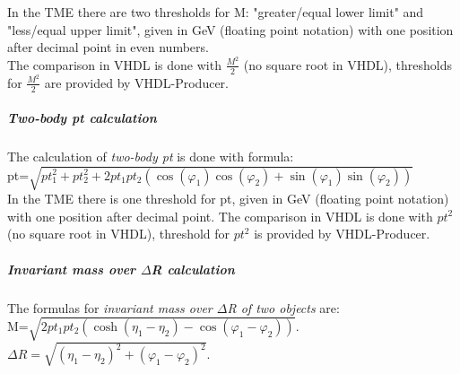 In the TME there are two thresholds for M: "greater/equal lower limit" and "less/equal upper limit", given in GeV (floating point notation) with one position after decimal point in even numbers.\\
The comparison in VHDL is done with $\frac{M^2}{2}$ (no square root in VHDL), thresholds for $\frac{M^2}{2}$ are provided by VHDL-Producer.

\subparagraph{Two-body pt calculation}
\label{sec:gtl:twobody_pt_calculation}

The calculation of \textit{two-body pt} is done with formula:\\

pt=$\sqrt{pt^2_1 + pt^2_2 + 2  pt_1 pt_2 (\cos(\varphi_1) \cos(\varphi_2) + \sin(\varphi_1) \sin(\varphi_2))}$\\

In the TME there is one threshold for pt, given in GeV (floating point notation) with one position after decimal point.
The comparison in VHDL is done with ${pt^2}$ (no square root in VHDL), threshold for ${pt^2}$ is provided by VHDL-Producer.

\subparagraph{Invariant mass over $\Delta$R calculation}
\label{sec:gtl:inv_mass_div_dr_calculation}

The formulas for \textit{invariant mass over $\Delta$R of two objects} are:\\

M=$\sqrt{2 pt_1  pt_2 (\cosh(\eta_1-\eta_2)-\cos(\varphi_1-\varphi_2))}$.\\

$\Delta$$R=\sqrt{(\eta_1-\eta_2)^2+(\varphi_1-\varphi_2)^2}$.\\

